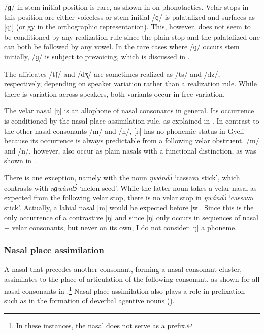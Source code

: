 /ɡ/ in stem-initial position is rare, as shown in  on phonotactics. Velar stops in this position are either voiceless or stem-initial /ɡ/ is palatalized and surfaces as [ɡj] (or {\textlangle}gy{\textrangle} in the orthographic representation). This, however, does not seem to be conditioned by any realization rule since the plain stop and the palatalized one can both be followed by any vowel. In the rare cases where /ɡ/ occurs stem initially, /ɡ/ is subject to prevoicing, which is discussed in .

 The affricates /tʃ/ and /dʒ/ are sometimes realized as /ts/ and /dz/, respectively, depending on speaker variation rather than a realization rule. While there is variation across speakers, both variants occur in free variation.


 The velar nasal [ŋ] is an allophone of nasal consonants in general. Its occurrence is conditioned by the nasal place assimilation rule, as explained in . In contrast to the other nasal consonants /m/ and /n/, [ŋ] has no phonemic status in Gyeli because its occurrence is always predictable from a following velar obstruent. /m/ and /n/, however, also occur as plain nasals with a functional distinction, as was shown in .

There is one exception, namely with the noun {\itshape ŋwándɔ́} `cassava stick', which contrasts with {\itshape ŋɡwàndɔ́} `melon seed'. While the latter noun takes a velar nasal as expected from the following velar stop, there is no velar stop in {\itshape ŋwándɔ́} `cassava stick'. Actually, a labial nasal [m] would be expected before [w]. Since this is the only occurrence of a contrastive [ŋ] and since [ŋ] only occurs in sequences of nasal + velar consonants, but never on its own, I do not consider [ŋ] a phoneme. 




\subsubsection{Nasal place assimilation} 
\label{sec:NPlaceAss}

A nasal that precedes another consonant, forming a nasal-consonant cluster, assimilates to the place of articulation of the following consonant, as shown for all nasal consonants in .\footnote{In these instances, the nasal does not serve as a prefix.} Nasal place assimilation also plays a role in prefixation such as in the formation of deverbal agentive nouns ().

